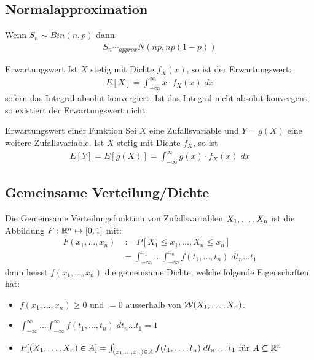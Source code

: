\subsection{Normalapproximation}
Wenn $S_n \sim Bin (n, p)$ dann
\begin{align*}
  S_n \sim_{approx} N (np, np (1-p))
\end{align*}
\begin{definition}{Erwartungswert}
  Ist $X$ stetig mit Dichte $f_X (x)$, so ist der Erwartungswert:
  \begin{align*}
    E[X] = \int_{-\infty}^\infty x \cdot f_X (x) \; dx
  \end{align*}
  sofern das Integral absolut konvergiert. Ist das Integral nicht
  absolut konvergent, so existiert der Erwartungswert nicht.
\end{definition}
\begin{definition}{Erwartungswert einer Funktion}
  Sei $X$ eine Zufallsvariable und $Y = g (X)$ eine weitere Zufallsvariable. Ist
  $X$ stetig mit Dichte $f_X$, so ist
  \begin{align*}
    E[Y] = E[g (X)] = \int_{-\infty}^\infty g (x) \cdot f_X (x) \; dx
  \end{align*}
\end{definition}

\subsection{Gemeinsame Verteilung/Dichte}
Die Gemeinsame Verteilungsfunktion von Zufallsvariablen $X_1, \dots, X_n$ ist die Abbildung $F: \mathbb{R}^n \mapsto [0, 1]$ mit:
\begin{align*}
  F (x_1, \dots, x_n) & := P[X_1 \leq x_1, \dots, X_n \leq x_n]                                                 \\
                      & = \int_{-\infty}^{x_1} \dots \int_{-\infty}^{x_n} f (t_1, \dots, t_n) \; dt_n \dots t_1
\end{align*}
dann heisst $f (x_1, \dots, x_n)$ die gemeinsame Dichte, welche folgende
Eigenschaften hat:
\begin{itemize}
  \item $f (x_1, \dots, x_n) \geq 0$ und $= 0$ ausserhalb von $\mathcal{W} (X_1, \dots, X_n)$.
  \item $\int_{-\infty}^\infty \dots \int_{-\infty}^\infty f (t_1, \dots, t_n) \; dt_n \dots t_1 = 1$
  \item $P[ (X_1, \dots, X_n) \in A] = \int_{ (x_1, \dots, x_n) \in A} f (t_1, \dots, t_n) \; dt_n \dots t_1$ für $A \subseteq \mathbb{R}^n$
\end{itemize}
